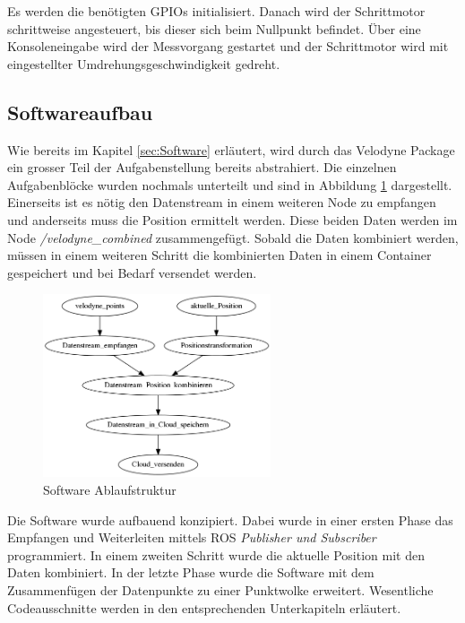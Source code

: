 Es werden die benötigten GPIOs initialisiert. Danach wird der Schrittmotor schrittweise angesteuert, bis dieser sich beim Nullpunkt befindet. Über eine Konsoleneingabe wird der Messvorgang gestartet und der Schrittmotor wird mit eingestellter Umdrehungsgeschwindigkeit gedreht.
 
\subsection{Softwareaufbau}
\label{subsec:Softwareaufbau}
Wie bereits im Kapitel \ref{sec:Software} erläutert, wird durch das Velodyne Package ein grosser Teil der Aufgabenstellung bereits abstrahiert. Die einzelnen Aufgabenblöcke wurden nochmals unterteilt und sind in Abbildung \ref{fig:software_flow} dargestellt. Einerseits ist es nötig den Datenstream in einem weiteren Node zu empfangen und anderseits muss die Position ermittelt werden. Diese beiden Daten werden im Node \textit{/velodyne\_combined} zusammengefügt. Sobald die Daten kombiniert werden, müssen in einem weiteren Schritt die kombinierten Daten in einem Container gespeichert und bei Bedarf versendet werden.

\begin{figure}[H]
	\centering
	\includegraphics[width=0.6\textwidth]{resources/software_flow.png}
	\caption[Software Ablaufstruktur]{Software Ablaufstruktur}
	\label{fig:software_flow}
\end{figure}  

Die Software wurde aufbauend konzipiert. Dabei wurde in einer ersten Phase das Empfangen und Weiterleiten mittels ROS \textit{Publisher und Subscriber} programmiert. In einem zweiten Schritt wurde die aktuelle Position mit den Daten kombiniert. In der letzte Phase wurde die Software mit dem Zusammenfügen der Datenpunkte zu einer Punktwolke erweitert. Wesentliche Codeausschnitte werden in den entsprechenden Unterkapiteln erläutert.


